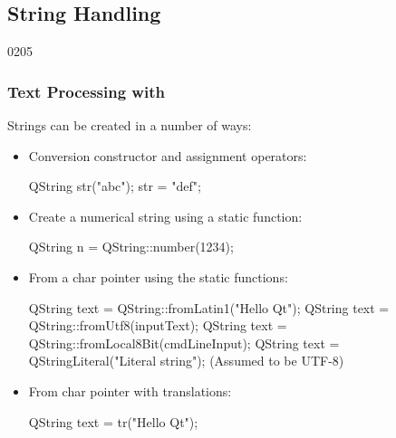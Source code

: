 %
%
%
%

\subsection{String Handling}


\begin{slide}[fragile]{0205}\frametitle{Text Processing with }
  \label{text_processing}
  Strings can be created in a number of ways:
  \begin{itemize}
  \item Conversion constructor and assignment operators:
 \begin{cpp}
QString str("abc");
str = "def";
  \end{cpp}
 \item Create a numerical string using a static function:
 \begin{cpp}
QString n = QString::number(1234);
  \end{cpp}
 \item From a char pointer using the static functions:
 \begin{cpp}
QString text = QString::fromLatin1("Hello Qt");
QString text = QString::fromUtf8(inputText);
QString text = QString::fromLocal8Bit(cmdLineInput);
QString text = QStringLiteral("Literal string"); (Assumed to be UTF-8)
  \end{cpp}
\item From char pointer with translations:
  \begin{cpp}
QString text = tr("Hello Qt");
  \end{cpp}
\end{itemize}
\end{slide}

